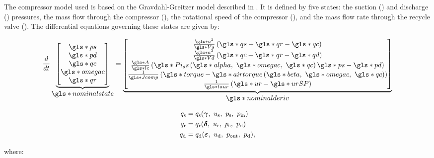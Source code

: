 The compressor model used is based on the Gravdahl-Greitzer model described in \cite{Gravdahl1999}. It is defined by five states: the suction () and discharge () pressures, the mass flow through the compressor (), the rotational speed of the compressor (), and the mass flow rate through the recycle valve ().
The differential equations governing these states are given by:

\begin{equation}
    \dt{} \ubrace{\begin{bmatrix}
      \g{ps}\\
      \g{pd}\\
      \g{qc}\\
      \g{omegac}\\
      \g{qr}
    \end{bmatrix}}{\g{nominalstate}} =
    \ubrace{\begin{bmatrix}
      \frac{\g{a}^2}{\g{Vs}}\left(\g{qs}+\g{qr}-\g{qc}\right)\\
      \frac{\g{a}^2}{\g{Vd}}\left(\g{qc}-\g{qr}-\g{qd}\right)\\
      \frac{\g{A}}{\g{lc}}\left(\g{Pi_ss}\left(\g{alpha},\ \g{omegac},\ \g{qc} \right)\g{ps} - \g{pd}  \right)\\
      \frac{1}{\g{Jcomp}}\left(\g{torque} - \g{airtorque}\left(\g{beta},\ \g{omegac},\ \g{qc}\right)\right)\\
      \frac{1}{\g{taur}}\left(\g{ur} - \g{urSP} \right)
    \end{bmatrix}}{\g{nominalderiv}}
  \label{eq:mod:single_comp_states}
\end{equation}

\begin{equation}
  \begin{split}
    q_\text{s} & = q_\text{s}(\vc{\gamma},\ u_{\text{s}},\ p_\text{s},\ p_{\text{in}})\\
    q_\text{r} & = q_\text{r}(\vc{\delta},\ u_\text{r},\ p_\text{s},\ p_\text{d})\\
    q_\text{d} & = q_\text{d}(\vc{\varepsilon},\ u_{\text{d}},\ p_{\text{out}},\ p_\text{d}),
  \end{split}
\end{equation}

\noindent where:

